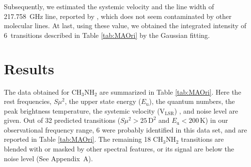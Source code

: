 Subsequently, we estimated the systemic velocity and the line width of 217.758~GHz line, 
reported by \citet{Pagani+2017}, which does not seem contaminated by other molecular lines.
At last, using these value, we obtained the integrated intensity of 6~transitions described in 
Table \ref{tab:MAOri} by the Gaussian fitting.


\newpage
\section{Results}
The data obtained for CH$_{3}$NH$_{2}$ are summarized in Table \ref{tab:MAOri}.
Here the rest frequencies, $S\mu^2$, the upper state energy ($E_{\mathrm{u}}$), the quantum numbers,
the peak brightness temperature, the systemic velocity (V$_{\mathrm{LSR}}$) , and noise level are given.
Out of 32 predicted transitions ($S\mu^2 > 25\,\mathrm{D^2}$ and $E_{\mathrm{u}} < 200 \,\mathrm{K}$) 
in our observational frequency range, 6 were probably identified in this data set, and are reported in
Table \ref{tab:MAOri}. The remaining 18 CH$_{3}$NH$_{2}$ transitions are
blended with or masked by other spectral features, or its signal are below the noise level 
(See Appendix~A). 

